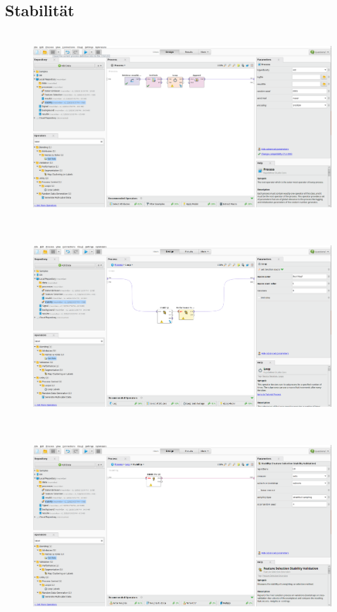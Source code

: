 \subsection{Stabilität}
\begin{figure}[H]
  \includegraphics[height=7cm]{./Figures/Aufgabe3c1.png}
  \centering
\end{figure}
\begin{figure}[H]
  \includegraphics[height=7cm]{./Figures/Aufgabe3c2.png}
  \centering
\end{figure}
\begin{figure}[H]
  \includegraphics[height=7cm]{./Figures/Aufgabe3c3.png}
  \centering
\end{figure}
